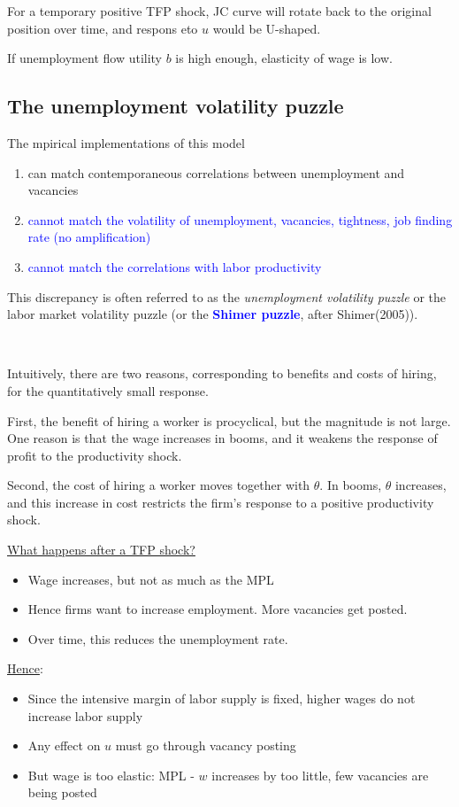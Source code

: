 For a temporary positive TFP shock, JC curve will rotate back to the original position over time,
and respons eto $u$ would be U-shaped.

If unemployment flow utility $b$ is high enough, elasticity of wage is low.

\subsection{The unemployment volatility puzzle}

The mpirical implementations of this model
\begin{enumerate}
    \item can match contemporaneous correlations between
    unemployment and vacancies
    \item \textcolor{blue}{cannot match the volatility of unemployment, vacancies,
    tightness, job finding rate (no amplification)}
    \item \textcolor{blue}{cannot match the correlations with labor productivity}
\end{enumerate}
This discrepancy is often referred to as the \textit{unemployment
volatility puzzle} or the labor market volatility puzzle 
(or the \textcolor{blue}{\textbf{Shimer puzzle}}, after Shimer(2005)).

\begin{remark}
    \

    Intuitively, there are two reasons, corresponding to benefits and 
    costs of hiring, for the quantitatively small response. 

    First, the benefit of hiring a worker is procyclical, but the magnitude is not large. 
    One reason is that the wage increases in booms, and it weakens the 
    response of profit to the productivity shock. 

    Second, the cost of hiring a worker moves together with $\theta$. 
    In booms, $\theta$ increases, and this increase in cost 
    restricts the firm’s response to a positive productivity shock.
\end{remark}

\underline{What happens after a TFP shock?}
\begin{itemize}
    \item Wage increases, but not as much as the MPL
    \item Hence ﬁrms want to increase employment. More vacancies
    get posted.
    \item Over time, this reduces the unemployment rate.
\end{itemize}
\underline{Hence}:
\begin{itemize}
    \item Since the intensive margin of labor supply is ﬁxed, higher
    wages do not increase labor supply
    \item Any eﬀect on $u$ must go through vacancy posting
    \item But wage is too elastic: MPL - $w$ increases by too little, few
    vacancies are being posted
\end{itemize}

